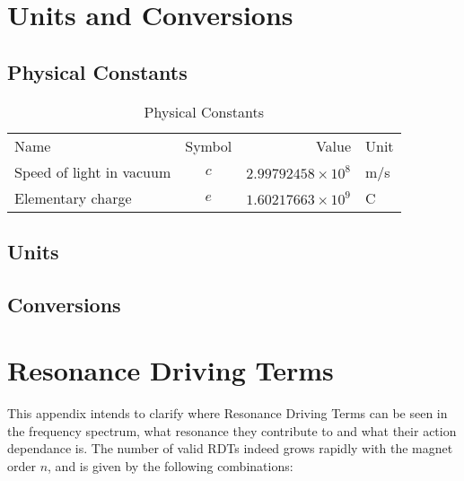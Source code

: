 \appendix  %
\chapter{Units and Conversions}
\thumbforappendix


\section{Physical Constants}

\begin{table}[H]
    \centering
    \begin{tabular}{lcrl}
    Name                        &    Symbol     &    Value                        &     Unit      \\
    Speed of light in vacuum    &     $c$       &   $2.99792458 \times 10^8$      &      m/s      \\
    Elementary charge           &     $e$       &   $1.60217663 \times 10^9$      &       C       \\
        
    \end{tabular}
    \caption{Physical Constants}
    \label{table:appendix:physical_constants}
\end{table}


\section{Units}



\section{Conversions}





\chapter{Resonance Driving Terms}
\thumbforappendix

This appendix intends to clarify where Resonance Driving Terms can be seen in the frequency spectrum, what resonance they contribute to and what their action dependance is.
The number of valid RDTs indeed grows rapidly with the magnet order $n$, and is given by the following combinations:

